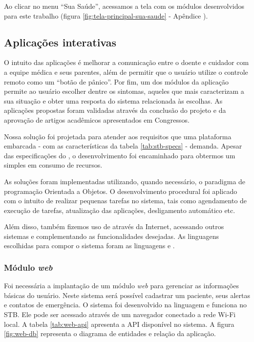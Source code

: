 Ao clicar no menu ``Sua Saúde'', acessamos a tela com os módulos desenvolvidos
para este trabalho (figura \ref{fig:tela-principal-sua-saude} - Apêndice 
).

\subsection{Aplicações interativas} \label{subsec:aplicacoes-tv-health}

O intuito das aplicações é melhorar a comunicação entre o doente e cuidador com
a equipe médica e seus parentes, além de permitir que o usuário utilize o
controle remoto como um ``botão de pânico''. Por fim, um dos módulos da
aplicação permite ao usuário escolher dentre os sintomas, aqueles que mais
caracterizam a sua situação e obter uma resposta do sistema relacionada às
escolhas. As aplicações  propostas foram validadas através da conclusão do
projeto \nextsaude[] e da aprovação de artigos acadêmicos apresentados em
Congressos.

Nossa solução foi projetada para atender aos requisitos que uma plataforma
embarcada - com as características da tabela \ref{tab:stb-specs} - demanda. Apesar 
das especificações do \hardware[], o desenvolvimento foi encaminhado para 
obtermos um \software[] simples em consumo de recursos.

As soluções foram implementadas utilizando, quando necessário, o paradigma
de programação Orientada a Objetos. O desenvolvimento procedural foi aplicado
com o intuito de realizar pequenas tarefas no sistema, tais como agendamento
de execução de tarefas, atualização das aplicações, desligamento automático etc.

Além disso, também fizemos uso de \webservices[] através da Internet, acessando
outros sistemas e complementando as funcionalidades desejadas. As linguagens
escolhidas para compor o sistema foram as linguagens \python[] e \shell.

\subsubsection{Módulo \textit{web}}

Foi necessária a implantação de um módulo \textit{web} para gerenciar as 
informações básicas do usuário. Neste sistema será possível cadastrar um 
paciente, seus alertas e contatos de emergência. O sistema foi desenvolvido
na linguagem \python[] e funciona no STB. Ele pode ser acessado através de
um navegador conectado a rede Wi-Fi local. A tabela \ref{tab:web-api} apresenta
a API disponível no sistema. A figura \vref{fig:web-db} representa o diagrama
de entidades e relação da aplicação.

